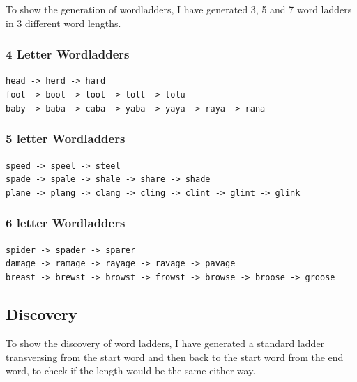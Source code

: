 \documentclass[10pt, a4paper]{article}
\begin{document}
To show the generation of wordladders, I have generated 3, 5 and 7 word ladders in 3 different word lengths.

\subsubsection{4 Letter Wordladders}

\hspace*{0.15in}
\texttt{head -> herd -> hard}\\

\texttt{foot -> boot -> toot -> tolt -> tolu}\\

\texttt{baby -> baba -> caba -> yaba -> yaya -> raya -> rana}\\

\subsubsection{5 letter Wordladders}
\hspace*{0.15in}
\texttt{speed -> speel -> steel}\\

\texttt{spade -> spale -> shale -> share -> shade}\\

\texttt{plane -> plang -> clang -> cling -> clint -> glint -> glink}\\

\subsubsection{6 letter Wordladders}
\hspace*{0.15in}
\texttt{spider -> spader -> sparer}\\

\texttt{damage -> ramage -> rayage -> ravage -> pavage}\\

\texttt{breast -> brewst -> browst -> frowst -> browse -> broose -> groose}\\

\subsection{Discovery}

To show the discovery of word ladders, I have generated a standard ladder transversing from the start word and then back to the start word from the end word, to check if the length would be the same either way.
\end{document}
